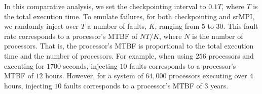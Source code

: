 

In this comparative analysis, we set the checkpointing interval to $0.1T$, where $T$ is the total execution time. To emulate failures, for both checkpointing and srMPI, we randomly inject over $T$ a number of faults, $K$, ranging from 5 to 30. This fault rate corresponds to a processor's MTBF of $NT/K$, where $N$ is the number of processors. That is, the processor's MTBF is proportional to the total execution time and the number of processors. For example, when using $256$ processors and executing for $1700$ seconds, injecting $10$ faults corresponds to a processor's MTBF of $12$ hours. However, for a system of $64,000$ processors executing over $4$ hours, injecting $10$ faults corresponds to a processor's MTBF of $3$ years.

